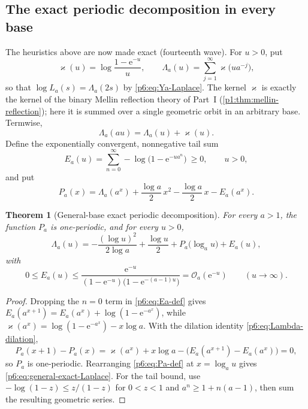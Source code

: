 \documentclass[11pt,oneside]{article}
\numberwithin{equation}{section}
\newtheorem{theorem}{Theorem}[section]
\theoremstyle{definition}
\theoremstyle{remark}
\newcommand{\e}{\mathrm e}
\newcommand{\bigO}{\mathcal O}
\begin{document}
\subsection{The exact periodic decomposition in every base}

The heuristics above are now made exact (fourteenth wave).  For $u>0$, put
\begin{equation}\label{p6:eq:kernel-varkappa}
 \varkappa(u)=\log\frac{1-\e^{-u}}{u},
 \qquad
 \Lambda_a(u)=\sum_{j=1}^{\infty}\varkappa\bigl(ua^{-j}\bigr),
\end{equation}
so that $\log L_a(s)=\Lambda_a(2s)$ by \eqref{p6:eq:Ya-Laplace}.  The kernel
$\varkappa$ is exactly the kernel of the binary Mellin reflection theory of
Part~I (\cref{p1:thm:mellin-reflection}); here it is summed over a single
geometric orbit in an arbitrary base.  Termwise,
\begin{equation}\label{p6:eq:Lambda-dilation}
 \Lambda_a(au)=\Lambda_a(u)+\varkappa(u).
\end{equation}
Define the exponentially convergent, nonnegative tail sum
\begin{equation}\label{p6:eq:Ea-def}
 E_a(u)=\sum_{n=0}^{\infty}-\log\bigl(1-\e^{-ua^{n}}\bigr)\ \ge0,
 \qquad u>0,
\end{equation}
and put
\begin{equation}\label{p6:eq:Pa-def}
 P_a(x)=\Lambda_a(a^x)+\frac{\log a}{2}\,x^2-\frac{\log a}{2}\,x-E_a(a^x).
\end{equation}

\begin{theorem}[General-base exact periodic decomposition]
\label{p6:thm:general-periodic}
For every $a>1$, the function $P_a$ is one-periodic, and for every $u>0$,
\begin{equation}\label{p6:eq:general-exact-Laplace}
 \Lambda_a(u)=
 -\frac{(\log u)^2}{2\log a}+\frac{\log u}{2}
 +P_a\bigl(\log_au\bigr)+E_a(u),
\end{equation}
with
\begin{equation}\label{p6:eq:Ea-bound}
 0\le E_a(u)\le
 \frac{\e^{-u}}{(1-\e^{-u})\bigl(1-\e^{-(a-1)u}\bigr)}
 =\bigO_a(\e^{-u})
 \qquad(u\to\infty).
\end{equation}
\end{theorem}

\begin{proof}
Dropping the $n=0$ term in \eqref{p6:eq:Ea-def} gives
$E_a(a^{x+1})=E_a(a^x)+\log(1-\e^{-a^x})$, while
$\varkappa(a^x)=\log(1-\e^{-a^x})-x\log a$.  With the dilation identity
\eqref{p6:eq:Lambda-dilation},
\[
 P_a(x+1)-P_a(x)
 =\varkappa(a^x)+x\log a
 -\bigl(E_a(a^{x+1})-E_a(a^x)\bigr)=0,
\]
so $P_a$ is one-periodic.  Rearranging \eqref{p6:eq:Pa-def} at $x=\log_au$
gives \eqref{p6:eq:general-exact-Laplace}.  For the tail bound, use
$-\log(1-z)\le z/(1-z)$ for $0<z<1$ and $a^n\ge1+n(a-1)$, then sum the
resulting geometric series.
\end{proof}
\end{document}
